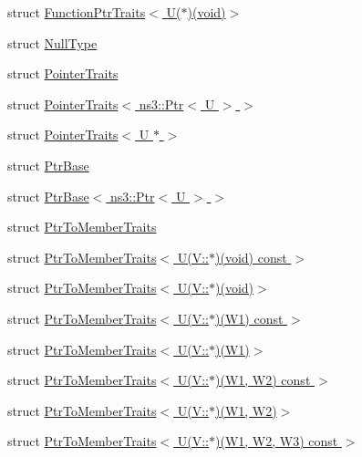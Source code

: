 \begin{DoxyCompactItemize}
\item 
struct \hyperlink{structTypeTraits_1_1FunctionPtrTraits_3_01U_07_5_08_07void_08_4}{Function\+Ptr\+Traits$<$ U($\ast$)(void)$>$}
\item 
struct \hyperlink{structTypeTraits_1_1NullType}{Null\+Type}
\item 
struct \hyperlink{structTypeTraits_1_1PointerTraits}{Pointer\+Traits}
\item 
struct \hyperlink{structTypeTraits_1_1PointerTraits_3_01ns3_1_1Ptr_3_01U_01_4_01_4}{Pointer\+Traits$<$ ns3\+::\+Ptr$<$ U $>$ $>$}
\item 
struct \hyperlink{structTypeTraits_1_1PointerTraits_3_01U_01_5_01_4}{Pointer\+Traits$<$ U $\ast$ $>$}
\item 
struct \hyperlink{structTypeTraits_1_1PtrBase}{Ptr\+Base}
\item 
struct \hyperlink{structTypeTraits_1_1PtrBase_3_01ns3_1_1Ptr_3_01U_01_4_01_4}{Ptr\+Base$<$ ns3\+::\+Ptr$<$ U $>$ $>$}
\item 
struct \hyperlink{structTypeTraits_1_1PtrToMemberTraits}{Ptr\+To\+Member\+Traits}
\item 
struct \hyperlink{structTypeTraits_1_1PtrToMemberTraits_3_01U_07V_1_1_5_08_07void_08_01const_01_01_4}{Ptr\+To\+Member\+Traits$<$ U(\+V\+::$\ast$)(void) const  $>$}
\item 
struct \hyperlink{structTypeTraits_1_1PtrToMemberTraits_3_01U_07V_1_1_5_08_07void_08_4}{Ptr\+To\+Member\+Traits$<$ U(\+V\+::$\ast$)(void)$>$}
\item 
struct \hyperlink{structTypeTraits_1_1PtrToMemberTraits_3_01U_07V_1_1_5_08_07W1_08_01const_01_01_4}{Ptr\+To\+Member\+Traits$<$ U(\+V\+::$\ast$)(\+W1) const  $>$}
\item 
struct \hyperlink{structTypeTraits_1_1PtrToMemberTraits_3_01U_07V_1_1_5_08_07W1_08_4}{Ptr\+To\+Member\+Traits$<$ U(\+V\+::$\ast$)(\+W1)$>$}
\item 
struct \hyperlink{structTypeTraits_1_1PtrToMemberTraits_3_01U_07V_1_1_5_08_07W1_00_01W2_08_01const_01_01_4}{Ptr\+To\+Member\+Traits$<$ U(\+V\+::$\ast$)(\+W1, W2) const  $>$}
\item 
struct \hyperlink{structTypeTraits_1_1PtrToMemberTraits_3_01U_07V_1_1_5_08_07W1_00_01W2_08_4}{Ptr\+To\+Member\+Traits$<$ U(\+V\+::$\ast$)(\+W1, W2)$>$}
\item 
struct \hyperlink{structTypeTraits_1_1PtrToMemberTraits_3_01U_07V_1_1_5_08_07W1_00_01W2_00_01W3_08_01const_01_01_4}{Ptr\+To\+Member\+Traits$<$ U(\+V\+::$\ast$)(\+W1, W2, W3) const  $>$}
\item 

\end{DoxyCompactItemize}
